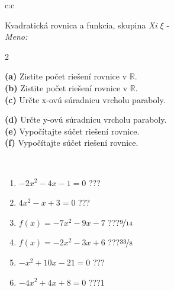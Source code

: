 \documentclass[10pt]{report}
\begin{document}
\begin{tabular}{c:c}
\begin{minipage}[c][104.5mm][t]{0.5\linewidth}
\begin{center}
\vspace{7mm}
{\huge {\LARGE Kvadratická rovnica a funkcia}, skupina \textit{Xi $\xi$} -}\\[5mm]
\textit{Meno:}\phantom{xxxxxxxxxxxxxxxxxxxxxxxxxxxxxxxxxxxxxxxxxxxxxxxxxxxxxxxxxxxxxxxxx}\\[5mm]
\begin{minipage}{0.95\linewidth}
\begin{center}
{\small \begin{multicols}{2} \raggedright
\textbf{(a)} Zistite počet riešení rovnice v \(\mathbb{R}\). \\[1mm]
\textbf{(b)} Zistite počet riešení rovnice v \(\mathbb{R}\). \\[1mm]
\textbf{(c)} Určte x-ovú súradnicu vrcholu paraboly. \par \columnbreak
\textbf{(d)} Určte y-ovú súradnicu vrcholu paraboly. \\[1mm]
\textbf{(e)} Vypočítajte súčet riešení rovnice. \\[1mm]
\textbf{(f)} Vypočítajte súčet riešení rovnice.
\end{multicols}
}
\end{center}
\end{minipage}
\\[4mm]
\begin{minipage}{0.79\linewidth}
\begin{center}
\begin{varwidth}{\linewidth}
\begin{enumerate}
\Large
\item $-2x^2-4x-1=0$\quad \dotfill\; ???\;\dotfill {}
\item $4x^2-x+3=0$\quad \dotfill\; ???\;\dotfill {}
\item $f(x)=-7x^2-9x-7$\quad \dotfill\; ???\;\dotfill \quad $\nicefrac{9}{14}$
\item $f(x)=-2x^2-3x+6$\quad \dotfill\; ???\;\dotfill \quad $\nicefrac{33}{8}$
\item $-x^2+10x-21=0$\quad \dotfill\; ???\;\dotfill {}
\item $-4x^2+4x+8=0$\quad \dotfill\; ???\;\dotfill \quad $1$
\end{enumerate}
\end{varwidth}
\end{center}
\end{minipage}

\end{center}
\end{minipage}
\end{tabular}
\end{document}
